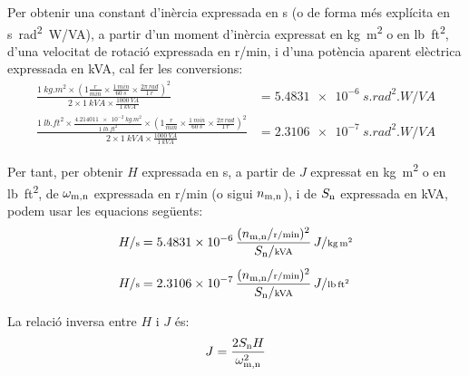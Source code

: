 Per  obtenir una constant d'inèrcia  expressada en \unit{s} (o de forma més explícita en \unit{s.rad^2.W/VA}), a partir d'un moment d'inèrcia expressat en \unit{kg.m^2} o en \unit{lb.ft^2}, d'una velocitat de rotació expressada en \unit{r/min}, i d'una potència aparent elèctrica expressada en \unit{kVA}, cal  fer les conversions:
\begin{subequations}
\begin{align}
    \frac{\qty{1}{kg.m^2} \times \left(1\frac{\unit{r}}{\unit{min}} \times \frac{\qty{1}{min}}{\qty{60}{s}} \times \frac{2\pi\,\unit{rad}}{\qty{1}{r}}\right)^2}{2\times \qty{1}{kVA} \times \frac{\qty{1000}{VA}}{\qty{1}{kVA}}}  &= \qty{5,4831e-6}{s.rad^2.W/VA} \\[1ex]
   \frac{\qty{1}{lb.ft^2} \times \frac{\qty{4,214011e-2}{kg.m^2}}{\qty{1}{lb.ft^2}} \times \left(1\frac{\unit{r}}{\unit{min}} \times \frac{\qty{1}{min}}{\qty{60}{s}} \times \frac{2\pi\,\unit{rad}}{\qty{1}{r}}\right)^2}{2\times \qty{1}{kVA}  \times
   \frac{\qty{1000}{VA}}{\qty{1}{kVA}}} &= \qty{2,3106e-7}{s.rad^2.W/VA}
\end{align}
\end{subequations}

Per tant, per  obtenir $H$ expressada en \unit{s}, a partir de $J$  expressat en \unit{kg.m^2} o en \unit{lb.ft^2}, de $\omega_\mathrm{m,n}$ expressada en \unit{r/min} (o sigui $n_\mathrm{m,n}$), i de $S_\mathrm{n}$ expressada en \unit{kVA}, podem usar les equacions següents:
\begin{subequations}
\begin{align}
    H/{\scriptstyle \unit{s}} &= \num{5,4831e-6}\,  \frac{(n\ped{m,n}/{\scriptstyle \unit{r/min}})^2}{S\ped{n}/{\scriptstyle \unit{kVA}}} \, J/{\scriptstyle \unit{kg.m^2}} \\[1ex]
    H/{\scriptstyle \unit{s}} &= \num{2,3106e-7}\,  \frac{(n\ped{m,n}/{\scriptstyle \unit{r/min}})^2}{S\ped{n}/{\scriptstyle \unit{kVA}}} \, J/{\scriptstyle \unit{lb.ft^2}}
\end{align}
\end{subequations}

La relació inversa entre $H$ i $J$ és:
\begin{equation}
    J = \frac{2 S_\mathrm{n} H}{\omega_\mathrm{m,n}^2}
\end{equation}

